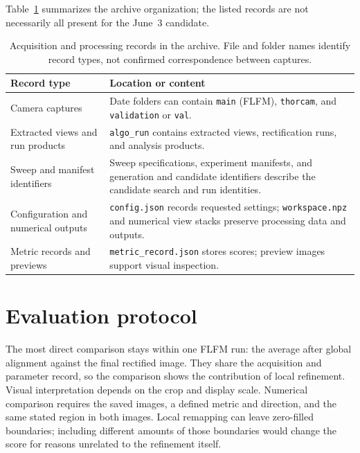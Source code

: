 Table~\ref{tab:acquisition-run-archive} summarizes the archive organization;
the listed records are not necessarily all present for the June~3 candidate.

\begin{table}[htbp]
    \centering
    \caption{Acquisition and processing records in the archive. File and folder
    names identify record types, not confirmed correspondence between captures.}
    \label{tab:acquisition-run-archive}
    \begin{tabular}{@{}>{\raggedright\arraybackslash}p{}>{\raggedright\arraybackslash}p{}@{}}
        \hline
        Record type & Location or content \\
        \hline
        Camera captures & Date folders can contain \texttt{main} (FLFM),
        \texttt{thorcam}, and \texttt{validation} or \texttt{val}. \\
        Extracted views and run products & \texttt{algo\_run} contains extracted
        views, rectification runs, and analysis products. \\
        Sweep and manifest identifiers & Sweep specifications, experiment
        manifests, and generation and candidate identifiers describe the
        candidate search and run identities. \\
        Configuration and numerical outputs & \texttt{config.json} records
        requested settings; \texttt{workspace.npz} and numerical view stacks
        preserve processing data and outputs. \\
        Metric records and previews & \texttt{metric\_record.json} stores scores;
        preview images support visual inspection. \\
        \hline
    \end{tabular}
\end{table}

\section{Evaluation protocol}
\label{sec:evaluation-protocol}

The most direct comparison stays within one FLFM run: the average after global
alignment against the final rectified image. They share the acquisition and
parameter record, so the comparison shows the contribution of local
refinement. Visual interpretation depends on the crop and display scale.
Numerical comparison requires the saved images, a defined metric and direction,
and the same stated region in both images. Local remapping can leave zero-filled
boundaries; including different amounts of those boundaries would change the
score for reasons unrelated to the refinement itself.


